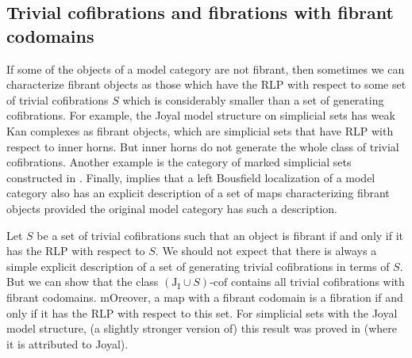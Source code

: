 \documentclass{tac}
\theoremstyle{definition}
\newcommand{\I}{\mathrm{I}}
\newcommand{\J}{\mathrm{J}}
\newcommand{\class}[2]{#1\text{-}\mathrm{#2}}
\newcommand{\Icof}[1][\I]{\class{#1}{cof}}
\begin{document}
\subsection{Trivial cofibrations and fibrations with fibrant codomains}

If some of the objects of a model category are not fibrant, then sometimes we can characterize fibrant objects as those which have
the RLP with respect to some set of trivial cofibrations $S$ which is considerably smaller than a set of generating cofibrations.
For example, the Joyal model structure on simplicial sets has weak Kan complexes as fibrant objects,
which are simplicial sets that have RLP with respect to inner horns.
But inner horns do not generate the whole class of trivial cofibrations.
Another example is the category of marked simplicial sets constructed in \cite[Proposition~3.1.3.7]{lurie-topos}.
Finally, \cite[Lemma~3.3.11]{hirschhorn} implies that a left Bousfield localization of a model category
also has an explicit description of a set of maps characterizing fibrant objects provided the original model category has such a description.

Let $S$ be a set of trivial cofibrations such that an object is fibrant if and only if it has the RLP with respect to $S$.
We should not expect that there is always a simple explicit description of a set of generating trivial cofibrations in terms of $S$.
But we can show that the class $\Icof[(\J_\I \cup S)]$ contains all trivial cofibrations with fibrant codomains.
mOreover, a map with a fibrant codomain is a fibration if and only if it has the RLP with respect to this set.
For simplicial sets with the Joyal model structure, (a slightly stronger version of) this result was proved in \cite[Corollary~2.4.6.5]{lurie-topos} (where it is attributed to Joyal).
\end{document}
